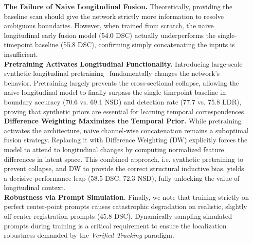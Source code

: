 \noindent\textbf{The Failure of Naive Longitudinal Fusion.} Theoretically, providing the baseline scan should give the network strictly more information to resolve ambiguous boundaries. However, when trained from scratch, the naive longitudinal early fusion model (54.0 DSC) actually underperforms the single-timepoint baseline (55.8 DSC), confirming simply concatenating the inputs is insufficient.\\
\noindent\textbf{Pretraining Activates Longitudinal Functionality.} Introducing large-scale synthetic longitudinal pretraining~\cite{Rokuss_2025_CVPR} fundamentally changes the network's behavior. Pretraining largely prevents the cross-sectional collapse, allowing the naive longitudinal model to finally surpass the single-timepoint baseline in boundary accuracy (70.6 vs. 69.1 NSD) and detection rate (77.7 vs. 75.8 LDR), proving that synthetic priors are essential for learning temporal correspondences.\\
\noindent\textbf{Difference Weighting Maximizes the Temporal Prior.} While pretraining activates the architecture, naive channel-wise concatenation remains a suboptimal fusion strategy. Replacing it with Difference Weighting (DW) explicitly forces the model to attend to longitudinal changes by computing normalized feature differences in latent space. This combined approach, i.e. synthetic pretraining to prevent collapse, and DW to provide the correct structural inductive bias, yields a decisive performance leap (58.5 DSC, 72.3 NSD), fully unlocking the value of longitudinal context.\\
\noindent\textbf{Robustness via Prompt Simulation.} Finally, we note that training strictly on perfect center-point prompts causes catastrophic degradation on realistic, slightly off-center registration prompts (45.8 DSC). Dynamically sampling simulated prompts during training is a critical requirement to ensure the localization robustness demanded by the \textit{Verified Tracking} paradigm.



